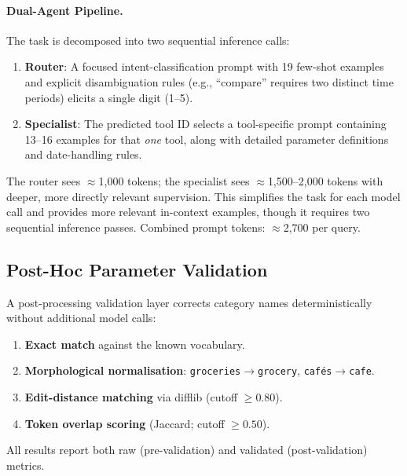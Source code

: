 \documentclass[11pt,twocolumn]{article}
\begin{document}
\paragraph{Dual-Agent Pipeline.}
The task is decomposed into two sequential inference calls:
\begin{enumerate}
    \item \textbf{Router}: A focused intent-classification prompt
          with 19 few-shot examples and explicit disambiguation rules
          (e.g., ``compare'' requires two distinct time periods) elicits
          a single digit (1--5).
    \item \textbf{Specialist}: The predicted tool ID selects a
          tool-specific prompt containing 13--16 examples for that
          \emph{one} tool, along with detailed parameter definitions
          and date-handling rules.
\end{enumerate}
The router sees $\approx$1,000 tokens; the specialist sees
$\approx$1,500--2,000 tokens with deeper, more directly relevant
supervision.
This simplifies the task for each model call and provides more
relevant in-context examples, though it requires two sequential
inference passes.
Combined prompt tokens: $\approx$2,700 per query.

\subsection{Post-Hoc Parameter Validation}
\label{sec:validation}

A post-processing validation layer corrects category names
deterministically without additional model calls:

\begin{enumerate}
    \item \textbf{Exact match} against the known vocabulary.
    \item \textbf{Morphological normalisation}:
          \texttt{groceries}$\to$\texttt{grocery},
          \texttt{caf\'{e}s}$\to$\texttt{cafe}.
    \item \textbf{Edit-distance matching} via difflib
          (cutoff $\geq 0.80$).
    \item \textbf{Token overlap scoring} (Jaccard;
          cutoff $\geq 0.50$).
\end{enumerate}

All results report both raw (pre-validation) and validated
(post-validation) metrics.

\end{document}
